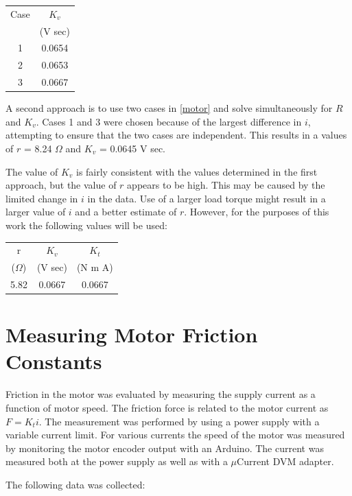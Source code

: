 \documentclass[12pt,letterpaper]{article}
\begin{document}
\begin{appendices}
\begin{tabular}{|c|c|}
\hline
Case & $K_{v}$  \\
         & (V sec) \\
\hline
1    & 0.0654  \\
2    & 0.0653  \\
3    & 0.0667  \\
\hline
\end{tabular}

A second approach is to use two cases in \eqref{motor} and solve simultaneously for $R$ and $K_{v}$.
Cases 1 and 3 were chosen because of the largest difference in $i$, attempting to ensure that the two
cases are independent.  This results in a values of $r$ = 8.24 $\Omega$ and $K_{v}$ = 0.0645 V sec.

The value of $K_{v}$ is fairly consistent with the values determined in the first approach, but the value
of $r$ appears to be high.  This may be caused by the limited change in $i$ in the data.  Use of a larger
load torque might result in a larger value of $i$ and a better estimate of $r$.  However, for the purposes
of this work the following values will be used:

\begin{tabular}{|c|c|c|}
\hline
r                   & $K_{v}$  & $K_{t}$ \\
($\Omega$)   & (V sec)   & (N m A) \\
\hline
5.82    & 0.0667  & 0.0667  \\
\hline
\end{tabular}

\section{Measuring Motor Friction Constants}
\label{appendix:friction}
Friction in the motor was evaluated by measuring the supply current as a function of motor speed.
The friction force is related to the motor current as $F = K_{t} i$.  The measurement was performed
by using a power supply with a variable current limit.  For various currents the speed of the motor
was measured by monitoring the motor encoder output with an Arduino.  The current was measured
both at the power supply as well as with a $\mu$Current DVM adapter.

The following data was collected:


\end{appendices}
\end{document}
